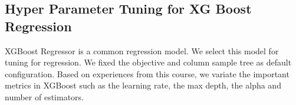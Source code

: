 \subsection{Hyper Parameter Tuning for XG Boost Regression}
XGBoost Regressor is a common regression model. We select this model for tuning for regression.  We fixed the objective and column sample tree as default configuration. Based on experiences from this course, we variate the important metrics in XGBoost such as the learning rate, the max depth, the alpha and number of estimators. 


